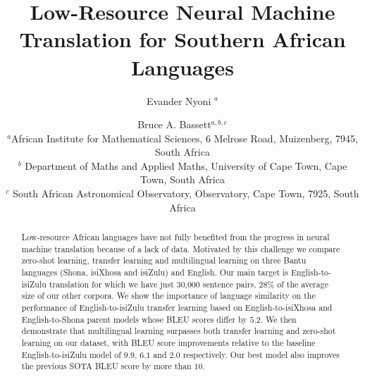 \documentclass[11pt,a4paper]{article}
\title{Low-Resource Neural Machine Translation for Southern African Languages}
\author{Evander Nyoni $^a$ \and Bruce A. Bassett$^{a,b,c}$\\
  $^a$African Institute for Mathematical Sciences, 6 Melrose Road, Muizenberg, 7945, South Africa \\
  $^b$ Department of Maths and Applied Maths, University of Cape Town, Cape Town, South Africa \\
  $^c$ South African Astronomical Observatory, Observatory, Cape Town, 7925, South Africa }
\date{}
\begin{document}
\maketitle
\begin{abstract}
Low-resource African languages have not fully benefited from the progress in neural machine translation because of a lack of data. Motivated by this challenge we compare zero-shot learning, transfer learning and multilingual learning on three Bantu languages (Shona, isiXhosa and isiZulu) and English. Our main target is English-to-isiZulu translation for which we have just 30,000 sentence pairs,  $28\%$ of the average size of our other corpora. We show the importance of language similarity on the performance of English-to-isiZulu transfer learning based on English-to-isiXhosa and English-to-Shona parent models whose BLEU scores differ by $5.2$. We then demonstrate that multilingual learning  surpasses both transfer learning and zero-shot learning on our dataset, with BLEU score  improvements relative to the baseline English-to-isiZulu model of $9.9$, $6.1$ and $2.0$ respectively. Our best model also improves the previous SOTA BLEU score by more than $10$.
\end{abstract}
\end{document}
